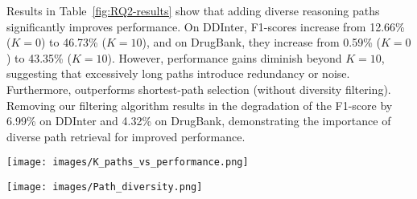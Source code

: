 Results in Table~\ref{fig:RQ2-results} show that adding diverse reasoning paths significantly improves performance.
On DDInter, F1-scores increase from 12.66\% ($K=0$) to 46.73\% ($K=10$), and on DrugBank, they increase from 0.59\% ($K=0$) to 43.35\% ($K=10$).  
However, performance gains diminish beyond $K=10$, suggesting that excessively long paths introduce redundancy or noise.  
Furthermore, \sys outperforms shortest-path selection (without diversity filtering).  
Removing our filtering algorithm results in the degradation of the F1-score by 6.99\% on DDInter and 4.32\% on DrugBank, demonstrating the importance of diverse path retrieval for improved performance.

\begin{figure*}[t]
  \centering
  \begin{minipage}{0.4\textwidth} %
    \centering
    \texttt{[image: images/K\_paths\_vs\_performance.png]}
  \end{minipage}
  \hspace{0.05\textwidth} %
  \begin{minipage}{0.4\textwidth}
    \centering
    \texttt{[image: images/Path\_diversity.png]}
  \end{minipage}
  
  \caption{Influence of path selection strategies on Llama 3.1 8B. Diverse paths are essential for performance improvement.}
  \label{fig:RQ2-results}
\end{figure*}



